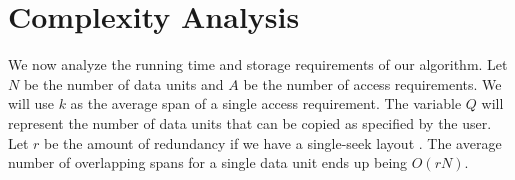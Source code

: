 \section{Complexity Analysis}

We now analyze the running time and storage requirements of our algorithm. Let
$N$ be the number of data units and $A$ be the number of access requirements.
We will use $k$ as the average span of a single access requirement. The
variable $Q$ will represent the number of data units that can be copied as
specified by the user. Let $r$ be the amount of redundancy if we have a
single-seek layout \cite{singleseeklayout}. The average number of overlapping
spans for a single data unit ends up being $O(rN)$. 


